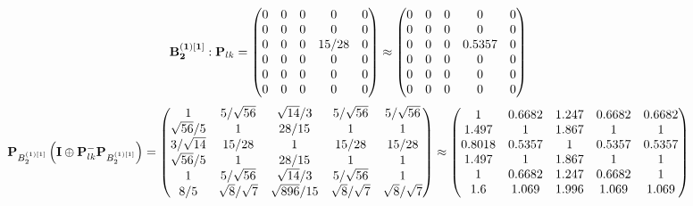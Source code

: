 \documentclass[10pt,a4paper]{article}
\begin{document}
	\[
		\bold{B_2^{(1)[1]}}: \bold{P}_{lk} = 
		\begin{pmatrix}
			{{0}}{} & {{0}}{} & {{0}}{} & {{0}}{} & {{0}}{} \\
			{{0}}{} & {{0}}{} & {{0}}{} & {{0}}{} & {{0}}{} \\
			{{0}}{} & {{0}}{} & {{0}}{} & {{15}} / {{28}} & {{0}}{} \\
			{{0}}{} & {{0}}{} & {{0}}{} & {{0}}{} & {{0}}{} \\
			{{0}}{} & {{0}}{} & {{0}}{} & {{0}}{} & {{0}}{} \\
			{{0}}{} & {{0}}{} & {{0}}{} & {{0}}{} & {{0}}{} \\
		\end{pmatrix}
		\approx
		\begin{pmatrix}
			0        & 0        & 0        & 0        & 0        \\
			0        & 0        & 0        & 0        & 0        \\
			0        & 0        & 0        & 0.5357   & 0        \\
			0        & 0        & 0        & 0        & 0        \\
			0        & 0        & 0        & 0        & 0        \\
			0        & 0        & 0        & 0        & 0        \\
		\end{pmatrix}
	\]
	\[
		\bold{P}_{B_2^{(1)[1]}}\left(\bold{I} \oplus \bold{P}_{lk}^{-}\bold{P}_{B_2^{(1)[1]}}\right) = 
		\begin{pmatrix}
			{1}{} & {{5}} / {\sqrt{56}} & {\sqrt{14}} / {{3}} & {{5}} / {\sqrt{56}} & {{5}} / {\sqrt{56}} \\
			{\sqrt{56}} / {{5}} & {1}{} & {{28}} / {{15}} & {1}{} & {1}{} \\
			{{3}} / {\sqrt{14}} & {{15}} / {{28}} & {1}{} & {{15}} / {{28}} & {{15}} / {{28}} \\
			{\sqrt{56}} / {{5}} & {1}{} & {{28}} / {{15}} & {1}{} & {1}{} \\
			{1}{} & {{5}} / {\sqrt{56}} & {\sqrt{14}} / {{3}} & {{5}} / {\sqrt{56}} & {1}{} \\
			{{8}} / {{5}} & {\sqrt{8}} / {\sqrt{7}} & {\sqrt{896}} / {{15}} & {\sqrt{8}} / {\sqrt{7}} & {\sqrt{8}} / {\sqrt{7}} \\
		\end{pmatrix}
		\approx
		\begin{pmatrix}
			1        & 0.6682   & 1.247    & 0.6682   & 0.6682   \\
			1.497    & 1        & 1.867    & 1        & 1        \\
			0.8018   & 0.5357   & 1        & 0.5357   & 0.5357   \\
			1.497    & 1        & 1.867    & 1        & 1        \\
			1        & 0.6682   & 1.247    & 0.6682   & 1        \\
			1.6      & 1.069    & 1.996    & 1.069    & 1.069    \\
		\end{pmatrix}
	\]
\end{document}
